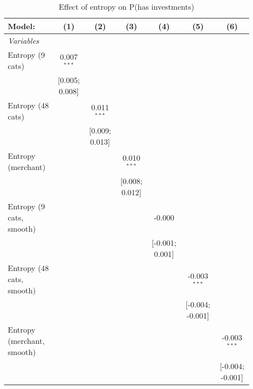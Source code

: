 
\begin{table}[htbp]
   \centering
   \tiny
   \begin{threeparttable}[b]
      \caption{\label{tab:reg_has_investments_nolag} Effect of entropy on P(has investments)}
      \begin{tabular}{lcccccc}
         \tabularnewline \midrule \midrule
         Model:                     & (1)            & (2)            & (3)            & (4)             & (5)              & (6)\\  
         \midrule
         \emph{Variables}\\
         Entropy (9 cats)           & 0.007$^{***}$  &                &                &                 &                  &   \\   
                                    & [0.005; 0.008] &                &                &                 &                  &   \\   
         Entropy (48 cats)          &                & 0.011$^{***}$  &                &                 &                  &   \\   
                                    &                & [0.009; 0.013] &                &                 &                  &   \\   
         Entropy (merchant)         &                &                & 0.010$^{***}$  &                 &                  &   \\   
                                    &                &                & [0.008; 0.012] &                 &                  &   \\   
         Entropy (9 cats, smooth)   &                &                &                & -0.000          &                  &   \\   
                                    &                &                &                & [-0.001; 0.001] &                  &   \\   
         Entropy (48 cats, smooth)  &                &                &                &                 & -0.003$^{***}$   &   \\   
                                    &                &                &                &                 & [-0.004; -0.001] &   \\   
         Entropy (merchant, smooth) &                &                &                &                 &                  & -0.003$^{***}$\\   
                                    &                &                &                &                 &                  & [-0.004; -0.001]\\   

\end{tabular}
\end{threeparttable}
\end{table}
